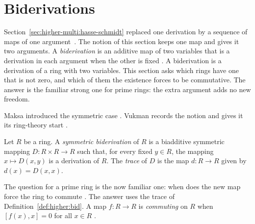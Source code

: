 \section{Biderivations}\label{sec:higher-multi:biderivations}

Section~\ref{sec:higher-multi:hasse-schmidt} replaced one derivation by a
sequence of maps of one argument~\cite[p.~245]{Vukman1989Bid}. The notion of this section keeps one map
and gives it two arguments. A \emph{biderivation} is an additive map of two
variables that is a derivation in each argument when the other is fixed
\cite[p.~245]{Vukman1989Bid}. A biderivation is a derivation of a ring with
two variables. This section asks which rings have one that is not zero, and
which of them the existence forces to be commutative. The answer is the
familiar strong one for prime rings: the extra argument adds no new freedom.

Maksa introduced the symmetric case
\cite[references~5 and~6]{Vukman1989Bid}. Vukman records the notion and gives
it its ring-theory start \cite[p.~245]{Vukman1989Bid}.

\begin{definition}\label{def:higher:bid}
Let $R$ be a ring. A \emph{symmetric biderivation} of $R$ is a biadditive
symmetric mapping $D\colon R\times R\to R$ such that, for every fixed $y\in
R$, the mapping $x\mapsto D(x,y)$ is a derivation of $R$. The \emph{trace}
of $D$ is the map $d\colon R\to R$ given by $d(x)=D(x,x)$.
\end{definition}

The question for a prime ring is the now familiar one: when does the new map
force the ring to commute \cite[p.~245]{Vukman1989Bid}. The answer uses the
trace of Definition~\ref{def:higher:bid}. A map $f\colon R\to R$ is
\emph{commuting} on $R$ when $[f(x),x]=0$ for all $x\in R$
\cite[p.~246]{Vukman1989Bid}.

